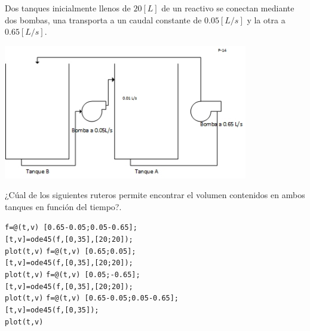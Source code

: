 \begin{pregunta}
\begin{cuerpo}
Dos tanques inicialmente llenos de $20[L]$ de un reactivo se conectan mediante dos bombas, una transporta a un caudal constante de $0.05[L/s]$ y la otra a $0.65[L/s]$. 
\begin{center}
\includegraphics[width=0.8\textwidth]{./img/p19.jpg}
\end{center}
¿C\'ual de los siguientes ruteros permite encontrar el volumen contenidos en ambos tanques en funci\'on del tiempo?.
\end{cuerpo}

\begin{multicols}{2}
\begin{alternativas}
{
\texttt{f=@(t,v) [0.65-0.05;0.05-0.65];}\\
\texttt{[t,v]=ode45(f,[0,35],[20;20]);}\\
\texttt{plot(t,v)} }
{
\texttt{f=@(t,v) [0.65;0.05];}\\
\texttt{[t,v]=ode45(f,[0,35],[20;20]);}\\
\texttt{plot(t,v)} }
{
\texttt{f=@(t,v) [0.05;-0.65];}\\
\texttt{[t,v]=ode45(f,[0,35],[20;20]);}\\
\texttt{plot(t,v)} }
{
\texttt{f=@(t,v) [0.65-0.05;0.05-0.65];}\\
\texttt{[t,v]=ode45(f,[0,35]);}\\
\texttt{plot(t,v)} }
\end{alternativas}
\end{multicols}
\justificacion{8cm}
\end{pregunta}
